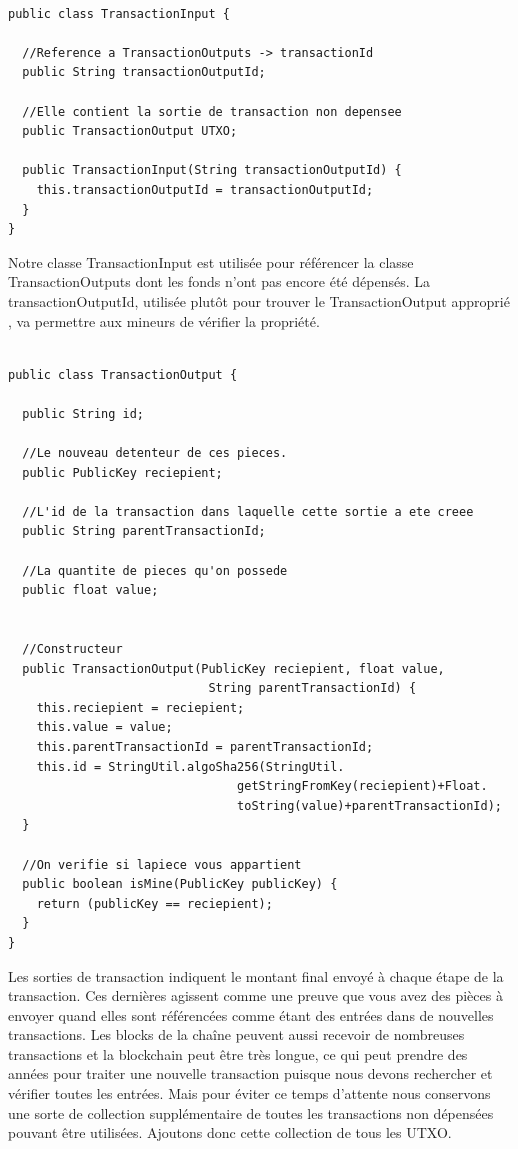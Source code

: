\documentclass[12pt]{report}
\begin{document}
\begin{lstlisting}

public class TransactionInput {

  //Reference a TransactionOutputs -> transactionId
  public String transactionOutputId; 
  
  //Elle contient la sortie de transaction non depensee
  public TransactionOutput UTXO;
	
  public TransactionInput(String transactionOutputId) {
    this.transactionOutputId = transactionOutputId;
  }
}
\end{lstlisting}

\hspace{1cm} Notre classe TransactionInput est utilisée pour référencer la classe TransactionOutputs dont les fonds n'ont pas encore été dépensés. La transactionOutputId, utilisée plutôt pour trouver le TransactionOutput approprié , va permettre aux mineurs de vérifier la propriété.

\begin{lstlisting}

public class TransactionOutput {

  public String id;
  
  //Le nouveau detenteur de ces pieces.
  public PublicKey reciepient; 
  
  //L'id de la transaction dans laquelle cette sortie a ete creee
  public String parentTransactionId; 
  
  //La quantite de pieces qu'on possede
  public float value; 
  
	
  //Constructeur
  public TransactionOutput(PublicKey reciepient, float value, 
                            String parentTransactionId) {
    this.reciepient = reciepient;
    this.value = value;
    this.parentTransactionId = parentTransactionId;
    this.id = StringUtil.algoSha256(StringUtil.
                                getStringFromKey(reciepient)+Float.
                                toString(value)+parentTransactionId);
  }
	
  //On verifie si lapiece vous appartient
  public boolean isMine(PublicKey publicKey) {
    return (publicKey == reciepient);
  }
}
\end{lstlisting}

\hspace{1cm} Les sorties de transaction indiquent le montant final envoyé à chaque étape de la transaction. Ces dernières agissent comme une preuve que vous avez des pièces à envoyer quand elles sont référencées comme étant des entrées dans de nouvelles transactions. Les blocks de la chaîne peuvent aussi recevoir de nombreuses transactions et la blockchain peut être très longue, ce qui peut prendre des années pour traiter une nouvelle transaction puisque nous devons rechercher et vérifier toutes les entrées. Mais pour éviter ce temps d'attente nous conservons une sorte de collection supplémentaire de toutes les transactions non dépensées pouvant être utilisées. Ajoutons donc cette collection de tous les UTXO.
\end{document}
